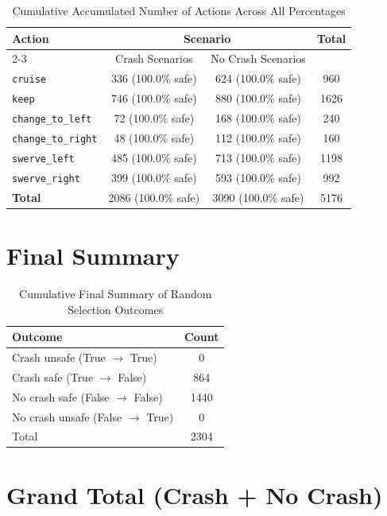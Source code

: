 \documentclass{article}
\begin{document}
\begin{table}[h]
\centering
\caption{Cumulative Accumulated Number of Actions Across All Percentages}
\begin{tabular}{l|cc|c}
\toprule
\multirow{2}{*}{Action} & \multicolumn{2}{c|}{Scenario} & \multirow{2}{*}{Total} \\
\cmidrule{2-3}
 & Crash Scenarios & No Crash Scenarios \\
\midrule
\texttt{cruise} & 336 (100.0\% safe) & 624 (100.0\% safe) & 960 \\ 
\texttt{keep} & 746 (100.0\% safe) & 880 (100.0\% safe) & 1626 \\ 
\texttt{change\_to\_left} & 72 (100.0\% safe) & 168 (100.0\% safe) & 240 \\ 
\texttt{change\_to\_right} & 48 (100.0\% safe) & 112 (100.0\% safe) & 160 \\ 
\texttt{swerve\_left} & 485 (100.0\% safe) & 713 (100.0\% safe) & 1198 \\ 
\texttt{swerve\_right} & 399 (100.0\% safe) & 593 (100.0\% safe) & 992 \\ 
\midrule
\textbf{Total} & 2086 (100.0\% safe) & 3090 (100.0\% safe) & 5176 \\ 
\bottomrule
\end{tabular}
\end{table}

\section{Final Summary}

\begin{table}[h]
\centering
\caption{Cumulative Final Summary of Random Selection Outcomes}
\begin{tabular}{lc}
\toprule
Outcome & Count \\
\midrule
Crash unsafe (True $\rightarrow$ True) & 0 \\ 
Crash safe (True $\rightarrow$ False) & 864 \\ 
No crash safe (False $\rightarrow$ False) & 1440 \\ 
No crash unsafe (False $\rightarrow$ True) & 0 \\ 
\midrule
Total & 2304 \\ 
\bottomrule
\end{tabular}
\end{table}

\section{Grand Total (Crash + No Crash)}
\end{document}
